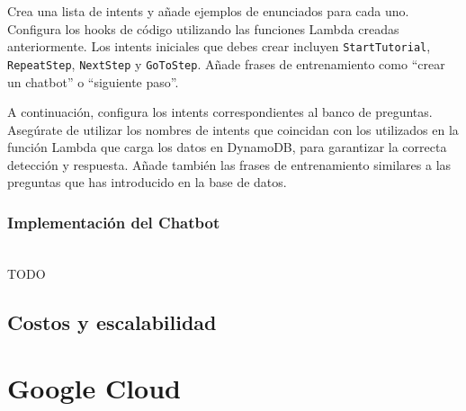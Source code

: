 Crea una lista de intents y añade ejemplos de enunciados para cada uno. Configura los hooks de código utilizando las funciones Lambda creadas anteriormente. Los intents iniciales que debes crear incluyen \texttt{StartTutorial}, \texttt{RepeatStep}, \texttt{NextStep} y \texttt{GoToStep}. Añade frases de entrenamiento como “crear un chatbot” o “siguiente paso”.

A continuación, configura los intents correspondientes al banco de preguntas. Asegúrate de utilizar los nombres de intents que coincidan con los utilizados en la función Lambda que carga los datos en DynamoDB, para garantizar la correcta detección y respuesta. Añade también las frases de entrenamiento similares a las preguntas que has introducido en la base de datos.

\subsubsection{Implementación del Chatbot}
\\TODO


\subsection{Costos y escalabilidad}\label{costos-aws}


\section{Google Cloud}\label{GCP}

